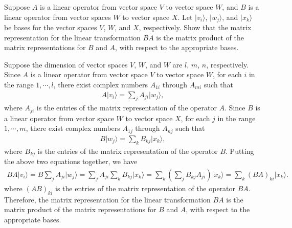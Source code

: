 \documentclass[en]{sol-man}
\begin{document}
\begin{exe}
    Suppose $A$ is a linear operator from vector space $V$ to vector space $W$, and $B$ is a linear operator from vector spaces $W$ to vector space $X$. Let $\lvert v_i\rangle$, $\lvert w_j\rangle$, and $\lvert x_k\rangle$ be bases for the vector spaces $V$, $W$, and $X$, respectively. Show that the matrix representation for the linear transformation $BA$ is the matrix product of the matrix representations for $B$ and $A$, with respect to the appropriate bases.
\end{exe}
\begin{pf}
    Suppose the dimension of vector spaces $V$, $W$, and $W$ are $l$, $m$, $n$, respectively. Since $A$ is a linear operator from vector space $V$ to vector space $W$, for each $i$ in the range $1,\cdots,l$, there exist complex numbers $A_{1i}$ through $A_{mi}$ such that
    \begin{align}
        A\lvert v_i\rangle=\sum_jA_{ji}\lvert w_j\rangle,
    \end{align}
    where $A_{ji}$ is the entries of the matrix representation of the operator $A$.
    Since $B$ is a linear operator from vector space $W$ to vector space $X$, for each $j$ in the range $1,\cdots,m$, there exist complex numbers $A_{1j}$ through $A_{nj}$ such that
    \begin{align}
        B\lvert w_j\rangle=\sum_kB_{kj}\lvert x_k\rangle,
    \end{align}
    where $B_{kj}$ is the entries of the matrix representation of the operator $B$.
    Putting the above two equations together, we have
    \begin{align}
        BA\lvert v_i\rangle=B\sum_jA_{ji}\lvert w_j\rangle=\sum_jA_{ji}\sum_kB_{kj}\lvert x_k\rangle=\sum_k\left(\sum_jB_{kj}A_{ji}\right)\lvert x_k\rangle=\sum_k(BA)_{ki}\lvert x_k\rangle.
    \end{align}
    where $(AB)_{ki}$ is the entries of the matrix representation of the operator $BA$. Therefore, the matrix representation for the linear transformation $BA$ is the matrix product of the matrix representations for $B$ and $A$, with respect to the appropriate bases.
\end{pf}
\end{document}
